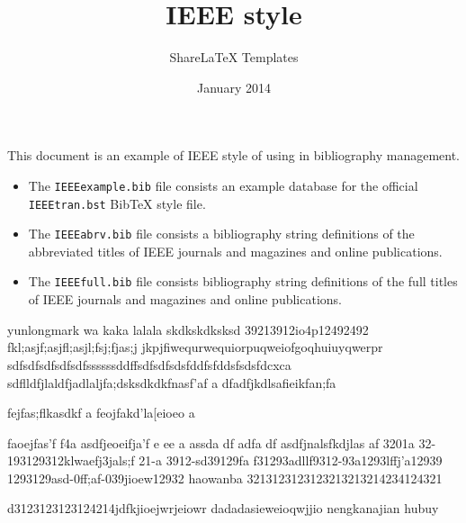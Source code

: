 \documentclass{article}
\title{IEEE \BibTeX{Deep Convolutional Neurol Networks} style}
\author{ShareLaTeX Templates}
\date{January 2014}
\begin{document}
\maketitle

This document is an example of IEEE style of \BibTeX{} using in bibliography management. 
\begin{itemize}
\item The \texttt{IEEEexample.bib} file consists an example \BibTeX{} database for the official \texttt{IEEEtran.bst} BibTeX style file.
\item The \texttt{IEEEabrv.bib} file consists a \BibTeX{} bibliography string definitions of the abbreviated titles of IEEE journals and magazines and online publications.
\item The \texttt{IEEEfull.bib} file consists \BibTeX{} bibliography string definitions of the full titles of IEEE journals and magazines and online publications.
\end{itemize}


yunlongmark   wa kaka  
 lalala 
skdkskdksksd
39213912io4p12492492
fkl;asjf;asjfl;asjl;fsj;fjas;j
jkpjfiwequrwequiorpuqweiofgoqhuiuyqwerpr
sdfsdfsdfsdfsdfssssssddffsdfsdfsdsfddfsfddsfsdsfdcxca
sdflldfjlaldfjadlaljfa;dsksdkdkfnasf'af
a
dfadfjkdlsafieikfan;fa

fejfas;flkasdkf
a
feojfakd'la[eioeo
a

faoejfas'f
f4a
asdfjeoeifja'f
e
ee
a
assda
df
adfa
df
asdfjnalsfkdjlas
af
3201a
32-193129312klwaefj3jals;f
21-a
3912-sd39129fa
f31293adllf9312-93a1293lffj'a12939
1293129asd-0ff;af-039jioew12932
haowanba 
3213123123123213213214234124321

d3123123123124214jdfkjioejwrjeiowr
dadadasieweioqwjjio  nengkanajian   
hubuy

\nocite{*}


\end{document}
